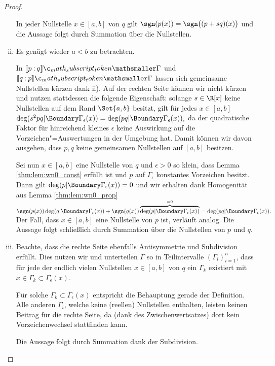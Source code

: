 \documentclass{mythesis}
\begin{document}
\begin{proposition}
\begin{proof}
\begin{enumerate}[i)]
                In jeder Nullstelle $x \in [a,b]$ von $q$ gilt $\sgn(p(x)) = \sgn\big((p+sq)(x)\big)$ und die Aussage folgt durch Summation über die Nullstellen.
            \item
                Es genügt wieder $a < b$ zu betrachten.

                In $\Index{\Gamma}{p}{q}$ und $\Index{\Gamma}{q}{p}$ lassen sich gemeinsame Nullstellen kürzen dank ii).
                Auf der rechten Seite können wir nicht kürzen und nutzen stattdessen die folgende Eigenschaft:
                solange $s \in \R[x]$ keine Nullstellen auf dem Rand $\Set{a,b}$ besitzt, gilt für jedes $x \in [a,b]$
                \begin{math}
                    \deg(s^2 pq|\Boundary\Gamma_\epsilon(x)) = \deg(pq|\Boundary\Gamma_\epsilon(x)),
                \end{math}
                da der quadratische Faktor für hinreichend kleines $\epsilon$ keine Auswirkung auf die Vorzeichen"=Auswertungen in der Umgebung hat.
                Damit können wir davon ausgehen, dass $p, q$ keine gemeinsamen Nullstellen auf $[a,b]$ besitzen.

                Sei nun $x \in [a,b]$ eine Nullstelle von $q$ und $\epsilon > 0$ so klein, dass Lemma \ref{thm:lem:wn0_const} erfüllt ist und $p$ auf $\Gamma_\epsilon$ konstantes Vorzeichen besitzt.
                Dann gilt $\deg(p|\Boundary\Gamma_\epsilon(x)) = 0$ und wir erhalten dank Homogenität aus Lemma \ref{thm:lem:wn0_prop}
                \begin{math}
                    \sgn(p(x)) \deg(q|\Boundary\Gamma_\epsilon(x))
                    + \sgn(q(x)) \overbrace{\deg(p|\Boundary\Gamma_\epsilon(x))}^{=0}
                    = \deg(pq|\Boundary\Gamma_\epsilon(x)).
                \end{math}
                Der Fall, dass $x \in [a,b]$ eine Nullstelle von $p$ ist, verläuft analog.
                Die Aussage folgt schließlich durch Summation über die Nullstellen von $p$ und $q$.
            \item
                Beachte, dass die rechte Seite ebenfalls Antisymmetrie und Subdivision erfüllt.
                Dies nutzen wir und unterteilen $\Gamma$ so in Teilintervalle $(\Gamma_i)_{i=1}^n$, dass für jede der endlich vielen Nullstellen $x \in [a,b]$ von $q$ ein $\Gamma_k$ existiert mit $x \in \Gamma_k \subset \Gamma_\epsilon(x)$.

                Für solche $\Gamma_k \subset \Gamma_\epsilon(x)$ entspricht die Behauptung gerade der Definition.
                Alle anderen $\Gamma_i$, welche keine (reellen) Nullstellen enthalten, leisten keinen Beitrag für die rechte Seite, da (dank des Zwischenwertsatzes) dort kein Vorzeichenwechsel stattfinden kann.

                Die Aussage folgt durch Summation dank der Subdivision.
        \end{enumerate}
    \end{proof}
\end{proposition}
\end{document}
